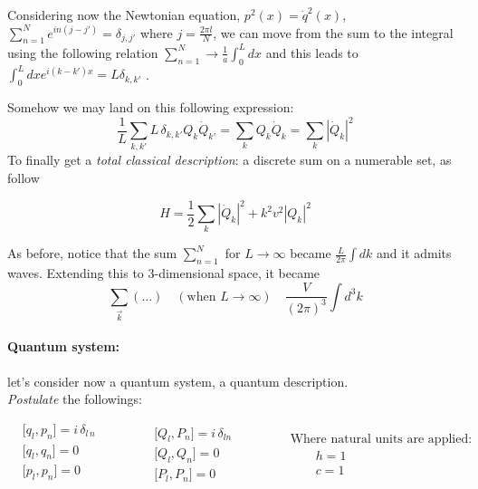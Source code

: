 \documentclass[class=article]{standalone}
\begin{document}
Considering now the Newtonian equation, $p^2(x) = \dot q^2(x) $, 
$ \sum_{n=1}^N e^{i n (j-j')} = \delta_{j, j'}$ where $j = \frac{2\pi l}{N}$, 
we can move from the sum to the integral using the following relation 
$ \sum_{n=1}^N \to \frac{1}{a} \int_{0}^{L} dx$ and this leads to
$\int_{0}^{L} dx e^{i (k-k') x} = L \delta_{k, k'}$ .

Somehow we may land on this following expression:
\begin{equation*}
\frac{1}{L} \sum_{k, k'} L \, \delta_{k, k'} Q_k \dot Q_{k'} = \sum_k Q_k \dot Q_{k} =   \sum_k | \dot Q_{k} |^2
\end{equation*}
To finally get a \emph{total classical description}: a discrete sum on a numerable set, as follow

\begin{equation*}
H = \frac{1}{2}  \sum_k  | \dot Q_{k} |^2 + k^2 v^2  | Q_{k} |^2
\end{equation*}

As before, notice that the sum $ \sum_{n=1}^N $ for $L \to \infty$ became $\frac{L}{2 \pi} \int dk$ and it admits waves.
Extending this to 3-dimensional space, it became
\begin{equation*}
 \sum_{\vec k} (\ldots) \quad (\mbox{when }L \to \infty) \quad \frac{V}{(2\pi)^3} \int d^3 k 
\end{equation*}

\paragraph{Quantum system:}  let's consider now a quantum system, a quantum description. \\
\emph{Postulate} the followings:

\begin{equation*}
\begin{split}
& \Big[ q_l , p_n \Big] = i \, \delta_{l\,n} \\
& \Big[ q_l , q_n \Big] = 0 \\
& \Big[ p_l , p_n \Big] = 0 \\
\end{split}\quad\quad\quad
\begin{split}
& \Big[ Q_l , P_n \Big] = i \, \delta_{ln} \\
& \Big[ Q_l , Q_n \Big] = 0 \\
& \Big[ P_l , P_n \Big] = 0
\end{split}\quad\quad\quad
\begin{split}
& \mbox{Where natural units are applied:} \\
& \quad\quad h = 1 \\
& \quad\quad c = 1
\end{split}
\end{equation*}
\end{document}
